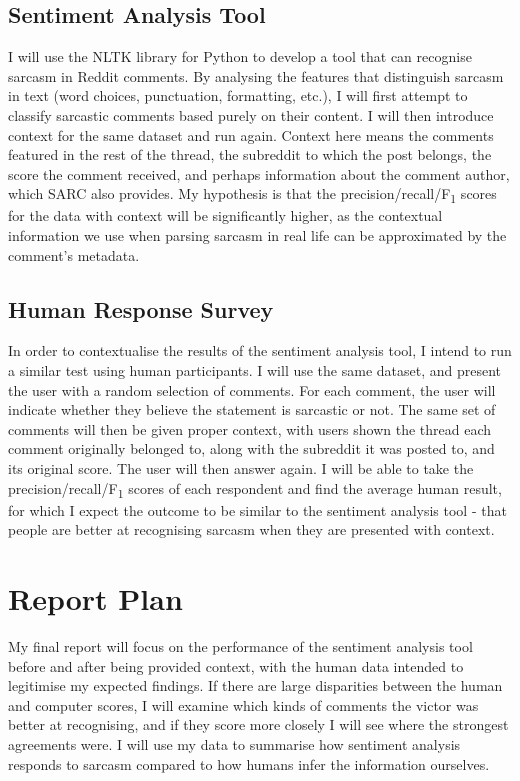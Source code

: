 \documentclass[a4paper,12pt]{article}
\begin{document}
\subsection{Sentiment Analysis Tool}
I will use the NLTK library for Python to develop a tool that can recognise sarcasm in Reddit comments. By analysing the features that distinguish sarcasm in text (word choices, punctuation, formatting, etc.), I will first attempt to classify sarcastic comments based purely on their content. I will then introduce context for the same dataset and run again. Context here means the comments featured in the rest of the thread, the subreddit to which the post belongs, the score the comment received, and perhaps information about the comment author, which SARC also provides. My hypothesis is that the precision/recall/F\textsubscript{1} scores for the data with context will be significantly higher, as the contextual information we use when parsing sarcasm in real life can be approximated by the comment's metadata.

\subsection{Human Response Survey}
In order to contextualise the results of the sentiment analysis tool, I intend to run a similar test using human participants. I will use the same dataset, and present the user with a random selection of comments. For each comment, the user will indicate whether they believe the statement is sarcastic or not. The same set of comments will then be given proper context, with users shown the thread each comment originally belonged to, along with the subreddit it was posted to, and its original score. The user will then answer again. I will be able to take the precision/recall/F\textsubscript{1} scores of each respondent and find the average human result, for which I expect the outcome to be similar to the sentiment analysis tool - that people are better at recognising sarcasm when they are presented with context.

\section{Report Plan}
My final report will focus on the performance of the sentiment analysis tool before and after being provided context, with the human data intended to legitimise my expected findings. If there are large disparities between the human and computer scores, I will examine which kinds of comments the victor was better at recognising, and if they score more closely I will see where the strongest agreements were. I will use my data to summarise how sentiment analysis responds to sarcasm compared to how humans infer the information ourselves.
\end{document}
